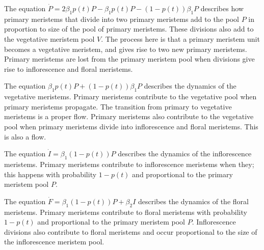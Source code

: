 \documentclass[12pt, oneside]{article}   	%
\begin{document}

The equation $\dot{P}  = 2 \beta_1 p(t) P - \beta_1 p(t) P - ( 1-p(t) ) \beta_1 P $ describes how primary meristems that divide into two primary meristems add to the pool $P$ in proportion to size of the pool of primary meristems. These divisions also add to the vegetative meristem pool $V$. The process here is that a primary meristem unit becomes a vegetative meristem, and gives rise to two new primary meristems. Primary meristems are lost from the primary meristem pool when divisions give rise to inflorescence and floral meristems.

The equation $ \beta_1 p(t) P + ( 1-p(t) ) \beta_1 P $ describes the dynamics of the vegetative meristems. Primary meristems contribute to the vegetative pool when primary meristems propagate. The transition from primary to vegetative meristems is a proper flow. Primary meristems also contribute to the vegetative pool when primary meristems divide into inflorescence and floral meristems. This is also a flow.
 
The equation $\dot{I} = \beta_1 ( 1-p(t) ) P $ describes the dynamics of the inflorescence meristems. Primary meristems contribute to inflorescence meristems when they; this happens with probability $1-p(t)$ and proportional to the primary meristem pool $P$. 

The equation $\dot{F} = \beta_1 ( 1-p(t) ) P + \beta_2 I$ describes the dynamics of the floral meristems. Primary meristems contribute to floral meristems with probability $1-p(t)$ and proportional to the primary meristem pool $P$. Inflorescence divisions also contribute to floral meristems and occur proportional to the size of the inflorescence meristem pool.
\end{document}
